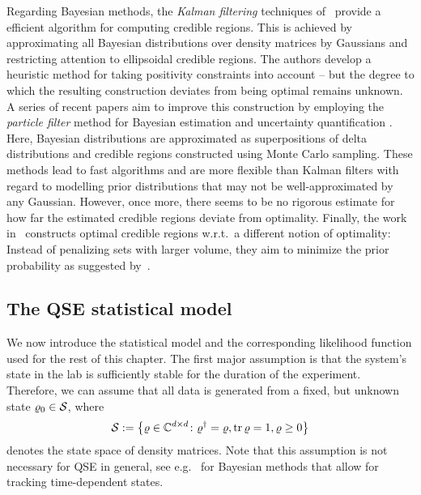 Regarding Bayesian methods, the \emph{Kalman filtering} techniques of~\cite{Audenaert_2008_Asymptotic} provide a efficient algorithm for computing credible regions.
This is achieved by approximating all Bayesian distributions over density matrices by Gaussians and restricting attention to ellipsoidal credible regions.
The authors develop a heuristic method for taking positivity constraints into account -- but the degree to which the resulting construction deviates from being optimal remains unknown.
A series of recent papers aim to improve this construction by employing the \emph{particle filter} method for Bayesian estimation and uncertainty quantification
\cite{Granade_2016_Practicala,Wiebe_2015_Bayesian,Ferrie_2014_High}.
Here, Bayesian distributions are approximated as superpositions of delta distributions and credible regions constructed using Monte Carlo sampling. These methods lead to fast algorithms and are more flexible than Kalman filters with regard to modelling prior distributions that may not be well-approximated by any Gaussian. However, once more, there seems to be no rigorous estimate for how far the estimated credible regions deviate from optimality.
Finally, the work in~\cite{Shang_2013_Optimal} constructs optimal credible regions w.r.t.\ a different notion of optimality:
Instead of penalizing sets with larger volume, they aim to minimize the prior probability as suggested by~\cite{Evans_2006_Optimally}.


\subsection{The QSE statistical model}
We now introduce the statistical model and the corresponding likelihood function used for the rest of this chapter.
The first major assumption is that the system's state in the lab is sufficiently stable for the duration of the experiment.
Therefore, we can assume that all data is generated from a fixed, but unknown state $\varrho_0 \in \mathcal{S}$, where
\[
  \mathcal{S} := \left\{ \varrho \in {\mathbb{C}}^{d \times d}\colon {{\varrho}^\dagger} = \varrho, \operatorname{tr} \varrho = 1, \varrho \ge 0 \right\}
\]
denotes the state space of density matrices.
Note that this assumption is not necessary for QSE in general, see e.g.~\cite{Granade_2016_Practicala} for Bayesian methods that allow for tracking time-dependent states.



